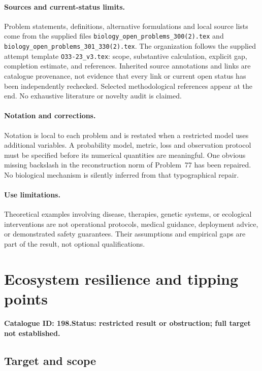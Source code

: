 \documentclass[11pt]{article}
\begin{document}
\paragraph{Sources and current-status limits.}
Problem statements, definitions, alternative formulations and local source lists
come from the supplied files
\texttt{biology\_open\_problems\_300(2).tex} and
\texttt{biology\_open\_problems\_301\_330(2).tex}.
The organization follows the supplied attempt template
\texttt{O33-23\_v3.tex}: scope, substantive calculation, explicit gap,
completion estimate, and references. Inherited source annotations and links are
catalogue provenance, not evidence that every link or current open status has
been independently rechecked. Selected methodological references appear at the
end. No exhaustive literature or novelty audit is claimed.

\paragraph{Notation and corrections.}
Notation is local to each problem and is restated when a restricted model uses
additional variables. A probability model, metric, loss and observation protocol
must be specified before its numerical quantities are meaningful. One obvious
missing backslash in the reconstruction norm of Problem~77 has been repaired.
No biological mechanism is silently inferred from that typographical repair.

\paragraph{Use limitations.}
Theoretical examples involving disease, therapies, genetic systems, or ecological
interventions are not operational protocols, medical guidance, deployment advice,
or demonstrated safety guarantees. Their assumptions and empirical gaps are part
of the result, not optional qualifications.

\setcounter{section}{197}
\section{Ecosystem resilience and tipping points}
\label{prob:198}
\noindent\textbf{Catalogue ID: 198.}\quad \textbf{Status: restricted result or obstruction; full target not established.}
\subsection{Target and scope}
\end{document}
